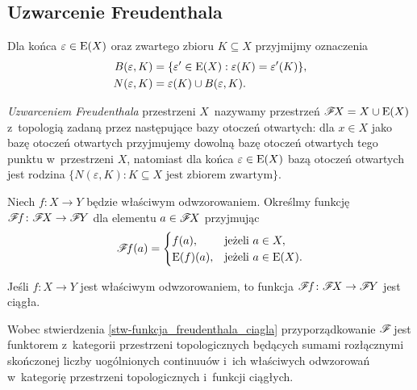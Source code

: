 

\subsection{Uzwarcenie Freudenthala}
Dla końca $\varepsilon\in \mathrm{E}(X)$ oraz zwartego zbioru $K\subseteq X$ przyjmijmy oznaczenia \begin{align*}B(\varepsilon,K)&=\{\varepsilon'\in \mathrm{E}(X): \varepsilon(K)=\varepsilon'(K)\},\\N(\varepsilon,K)&=\varepsilon(K)\cup B(\varepsilon,K).\end{align*} 

\textit{Uzwarceniem Freudenthala} \cite{Freudenthal31, Raymond60} przestrzeni $X$~nazywamy przestrzeń $\mathscr{F}\! X=X\cup \mathrm{E}(X)$ z~topologią zadaną przez następujące bazy otoczeń otwartych: dla $x\in X$ jako bazę otoczeń otwartych przyjmujemy dowolną bazę otoczeń otwartych tego punktu w~przestrzeni $X$, natomiast dla końca $\varepsilon\in\mathrm{E}(X)$ bazą otoczeń otwartych jest rodzina $\{N(\varepsilon,K): K\subseteq X\text{ jest zbiorem zwartym}\}$.

Niech $f\colon X\to Y$ będzie właściwym odwzorowaniem. Określmy funkcję $\mathscr{F}\! f\colon \mathscr{F}\! X\to \mathscr{F}\! Y$ dla elementu $a\in \mathscr{F}\! X$ przyjmując \[\mathscr{F}\! f(a)=\begin{cases}f(a), &\text{jeżeli } a\in X,\\ \mathrm{E}(f)(a), & \text{jeżeli } a\in\mathrm{E}(X).\end{cases}\]

\begin{stw}\label{stw-funkcja_freudenthala_ciagla}
Jeśli $f\colon X\to Y$ jest właściwym odwzorowaniem, to funkcja $\mathscr{F}\! f\colon \mathscr{F}\! X\to \mathscr{F}\! Y$ jest ciągła.
\end{stw}

Wobec stwierdzenia \ref{stw-funkcja_freudenthala_ciagla} przyporządkowanie $\mathscr{F}\!$ jest  funktorem z~kategorii przestrzeni topologicznych będących sumami rozłącznymi skończonej liczby uogólnionych continuuów i~ich właściwych odwzorowań w~kategorię przestrzeni topologicznych i~funkcji ciągłych.


